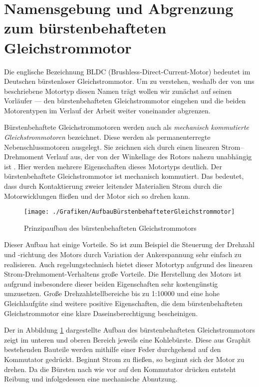 \section{Namensgebung und Abgrenzung zum bürstenbehafteten Gleichstrommotor}

Die englische Bezeichnung \glqq{}BLDC\grqq{} (Brushless-Direct-Current-Motor) bedeutet im Deutschen \glqq{}bürstenloser Gleichstrommotor\grqq{}. Um zu verstehen, weshalb der von uns beschriebene Motortyp diesen Namen trägt wollen wir zunächst auf seinen Vorläufer --- den bürstenbehafteten Gleichstrommotor eingehen und die beiden Motorentypen im Verlauf der Arbeit weiter voneinander abgrenzen.

Bürstenbehaftete Gleichstrommotoren werden auch als \emph{mechanisch kommutierte Gleichstrommotoren} bezeichnet. Diese \glqq{}werden als permanenterregte Nebenschlussmotoren ausgelegt. Sie zeichnen sich durch einen linearen Strom–Drehmoment Verlauf aus, der von der Winkellage des Rotors nahezu unabhängig ist\grqq{} \parencite[S.51]{Probst2011}. Hier werden mehrere Eigenschaften dieses Motortyps deutlich. Der bürstenbehaftete Gleichstrommotor ist mechanisch kommutiert. Das bedeutet, dass durch Kontaktierung zweier leitender Materialien Strom durch die Motorwicklungen fließen und der Motor sich so drehen kann.

\begin{figure}[H]
  \centering
  \texttt{[image: ./Grafiken/AufbauBürstenbehafteterGleichstrommotor]}
  \caption[Aufbau bürstenbehafteter Gleichstrommotor]{Prinzipaufbau des bürstenbehafteten Gleichstrommotors \parencite[S.51]{Probst2011}}
  \label{fig:AufbauBürstenbehaftet}
\end{figure}

Dieser Aufbau hat einige Vorteile. So ist zum Beispiel die Steuerung der Drehzahl und -richtung des Motors durch Variation der Ankerspannung sehr einfach zu realisieren. Auch regelungstechnisch bietet dieser Motortyp aufgrund des linearen Strom-Drehmoment-Verhaltens große Vorteile. Die Herstellung des Motors ist aufgrund insbesondere dieser beiden Eigenschaften sehr kostengünstig umzusetzen. \glqq{}Große Drehzahlstellbereiche bis zu 1:10000 und eine hohe Gleichlaufgüte\grqq{} \parencite[S.51]{Probst2011} sind weitere positive Eigenschaften, die dem bürstenbehafteten Gleichstrommotor eine klare Daseinsberechtigung bescheinigen.

Der in Abbildung \ref{fig:AufbauBürstenbehaftet} dargestellte Aufbau des bürstenbehafteten Gleichstrommotors zeigt im unteren und oberen Bereich jeweils eine Kohlebürste. Diese aus Graphit bestehenden Bauteile werden mithilfe einer Feder durchgehend auf den Kommutator gedrückt. Beginnt Strom zu fließen, so beginnt sich der Motor zu drehen. Da die Bürsten nach wie vor auf den Kommutator drücken entsteht Reibung und infolgedessen eine mechanische Abnutzung.

